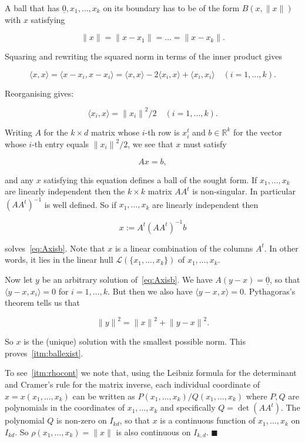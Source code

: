 \documentclass[10pt,a4paper]{amsart}
\newcommand{\Lcal}[0]{\ensuremath{{\mathcal L}}}
\newcommand{\eR}[0]{\ensuremath{ \mathbb R}}
\newcommand{\norm}[1]{\ensuremath{\|#1\|}}
\newcommand{\orig}{\underline{0}}
\newenvironment{proof}{\vspace{1ex}\noindent{\bf Proof.}}{\hspace*{\fill}$\blacksquare$\vspace{1ex}}
\begin{document}
\begin{proof}
A ball that has $\orig, x_1,\dots,x_k$ on its boundary has to be of the form $B(x,\norm{x})$ with $x$ satisfying

$$ \norm{x} = \norm{x-x_1} = \dots = \norm{x-x_k}. $$

\noindent
Squaring and rewriting the squared norm in terms of the inner product gives

$$ \langle x,x\rangle =  \langle x-x_i,x-x_i\rangle = 
\langle x,x\rangle - 2\langle x_i,x\rangle + \langle x_i,x_i\rangle \quad (i=1,\dots,k). $$

\noindent 
Reorganising gives:

$$ \langle x_i,x \rangle = \norm{x_i}^2/2 \quad (i=1,\dots,k). $$

\noindent
Writing $A$ for the $k\times d$ matrix whose $i$-th row is $x_i^t$ and $b \in \eR^k$ for the 
vector whose $i$-th entry equals $\norm{x_i}^2/2$, we see that $x$ must satisfy

\begin{equation}\label{eq:Axisb} 
A x = b,  
\end{equation}

 
\noindent
and any $x$ satisfying this equation defines a ball of the sought form.
If $x_1,\dots,x_k$ are linearly independent then the $k\times k$ matrix $A A^t$ is non-singular. 
In particular $(A A^t)^{-1}$ is well defined. So if $x_1,\dots,x_k$ are linearly independent then

\begin{equation}\label{eq:xsol} 
x := A^t(AA^t)^{-1} b
\end{equation}

\noindent 
solves~\eqref{eq:Axisb}.
Note that $x$ is a linear combination of the columns $A^t$. 
In other words, it lies in the linear hull $\Lcal(\{x_1,\dots,x_k\})$ of $x_1,\dots,x_k$. 

Now let $y$ be an arbitrary solution of~\eqref{eq:Axisb}.
We have $A (y-x) = \orig$, so that $\langle y-x, x_i\rangle = 0$ for $i=1,\dots, k$.
But then we also have $\langle y-x,x\rangle = 0$.
Pythagoras's theorem tells us that

$$ \norm{y}^2 = \norm{x}^2 + \norm{y-x}^2. $$

\noindent
So $x$ is the (unique) solution with the smallest possible norm. This proves~\ref{itm:ballexist}.

To see~\ref{itm:rhocont} we note that, using the Leibniz formula for the determinant 
and Cramer's rule for the matrix inverse, each individual coordinate of $x = x(x_1,\dots,x_k)$
can be written as $P(x_1,\dots,x_k)/Q(x_1,\dots,x_k)$ where $P,Q$ are polynomials in the 
coordinates of $x_1,\dots,x_k$ and specifically $Q = \det(AA^t)$.
The polynomial $Q$ is non-zero on $I_{kd}$, so that $x$ is a continuous function of $x_1,\dots,x_k$ on $I_{kd}$.
So $\rho(x_1,\dots,x_k)
= \norm{x}$ is also continuous on $I_{k,d}$.
\end{proof}
\end{document}
